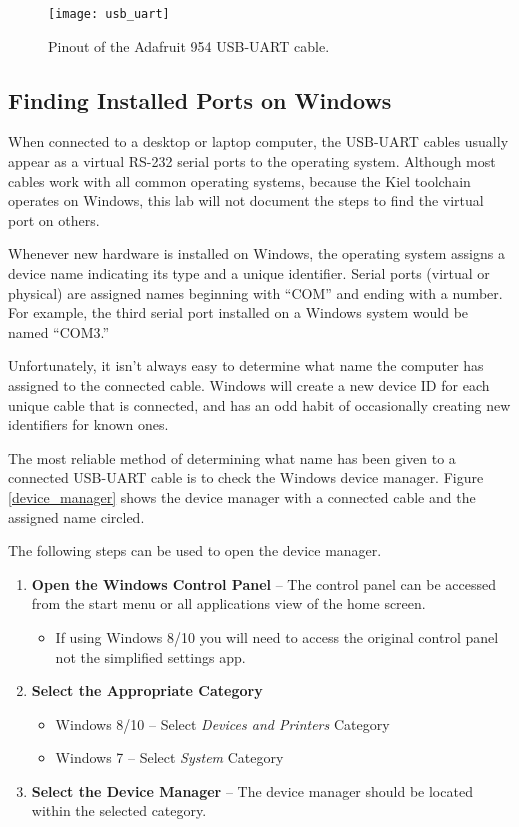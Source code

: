 \documentclass[11pt,fleqn]{book} %
\begin{document}
\begin{figure}[]
    \centering\texttt{[image: usb\_uart]}
    \caption{Pinout of the Adafruit 954 USB-UART cable.}
    \label{usb_uart}
\end{figure}

\subsection{Finding Installed Ports on Windows}
When connected to a desktop or laptop computer, the USB-UART cables usually appear as a virtual RS-232 serial ports to the operating system. Although most cables work with all common operating systems, because the Kiel toolchain operates on Windows, this lab will not document the steps to find the virtual port on others. 

Whenever new hardware is installed on Windows, the operating system assigns a device name indicating its type and a unique identifier. Serial ports (virtual or physical) are assigned names beginning with ``COM'' and ending with a number. For example, the third serial port installed on a Windows system would be named ``COM3.''

Unfortunately, it isn't always easy to determine what name the computer has assigned to the connected cable. Windows will create a new device ID for each unique cable that is connected, and has an odd habit of occasionally creating new identifiers for known ones. 

The most reliable method of determining what name has been given to a connected USB-UART cable is to check the Windows device manager. Figure \ref{device_manager} shows the device manager with a connected cable and the assigned name circled. 

The following steps can be used to open the device manager.

\begin{enumerate}
    \item \textbf{Open the Windows Control Panel} -- The control panel can be accessed from the start menu or all applications view of the home screen.
        \begin{itemize}
            \item If using Windows 8/10 you will need to access the original control panel not the simplified settings app.
        \end{itemize} 
    \item \textbf{Select the Appropriate Category}
     \begin{itemize}
        \item Windows 8/10 -- Select \textit{Devices and Printers} Category
        \item Windows 7 -- Select \textit{System} Category
    \end{itemize} 
    \item \textbf{Select the Device Manager} -- The device manager should be located within the selected category.
\end{enumerate}
\end{document}
